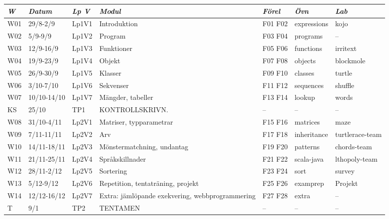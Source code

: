 \begin{tabular}{l|l|l|l|l|l|l}
\textit{W} & \textit{Datum} & \textit{Lp V} & \textit{Modul} & \textit{Förel} & \textit{Övn} & \textit{Lab} \\ \hline \hline
W01 & 29/8-2/9 & Lp1V1 & Introduktion & F01 F02 & expressions & kojo \\
W02 & 5/9-9/9 & Lp1V2 & Program & F03 F04 & programs & -- \\
W03 & 12/9-16/9 & Lp1V3 & Funktioner & F05 F06 & functions & irritext \\
W04 & 19/9-23/9 & Lp1V4 & Objekt & F07 F08 & objects & blockmole \\
W05 & 26/9-30/9 & Lp1V5 & Klasser & F09 F10 & classes & turtle \\
W06 & 3/10-7/10 & Lp1V6 & Sekvenser & F11 F12 & sequences & shuffle \\
W07 & 10/10-14/10 & Lp1V7 & Mängder, tabeller & F13 F14 & lookup & words \\
KS & 25/10 & TP1 & KONTROLLSKRIVN. & -- & -- & -- \\
W08 & 31/10-4/11 & Lp2V1 & Matriser, typparametrar & F15 F16 & matrices & maze \\
W09 & 7/11-11/11 & Lp2V2 & Arv & F17 F18 & inheritance & turtlerace-team \\
W10 & 14/11-18/11 & Lp2V3 & Mönstermatchning, undantag & F19 F20 & patterns & chords-team \\
W11 & 21/11-25/11 & Lp2V4 & Språkskillnader & F21 F22 & scala-java & lthopoly-team \\
W12 & 28/11-2/12 & Lp2V5 & Sortering & F23 F24 & sort & survey \\
W13 & 5/12-9/12 & Lp2V6 & Repetition, tentaträning, projekt & F25 F26 & examprep & Projekt \\
W14 & 12/12-16/12 & Lp2V7 & Extra: jämlöpande exekvering, webbprogrammering & F27 F28 & extra & -- \\
T & 9/1 & TP2 & TENTAMEN & -- & -- & -- \\
\end{tabular}
